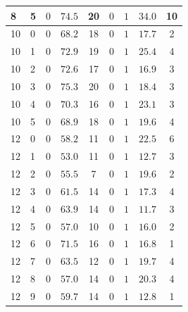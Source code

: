 \documentclass[conference]{IEEEtran}
\begin{document}
\begin{table}[t]
\begin{tabular}{@{}llccc@{\hspace{7pt}}cccc@{}}
8  & 5 & $0$ & $74.5$ & 20 & $0$ & $1$ & $34.0$ & 10 \\
\midrule
10 & 0 & $0$ & $68.2$ & 18 & $0$ & $1$ & $17.7$ & 2 \\
10 & 1 & $0$ & $72.9$ & 19 & $0$ & $1$ & $25.4$ & 4 \\
10 & 2 & $0$ & $72.6$ & 17 & $0$ & $1$ & $16.9$ & 3 \\
10 & 3 & $0$ & $75.3$ & 20 & $0$ & $1$ & $18.4$ & 3 \\
10 & 4 & $0$ & $70.3$ & 16 & $0$ & $1$ & $23.1$ & 3 \\
10 & 5 & $0$ & $68.9$ & 18 & $0$ & $1$ & $19.6$ & 4 \\
\midrule
12 & 0 & $0$ & $58.2$ & 11 & $0$ & $1$ & $22.5$ & 6 \\
12 & 1 & $0$ & $53.0$ & 11 & $0$ & $1$ & $12.7$ & 3 \\
12 & 2 & $0$ & $55.5$ & 7 & $0$ & $1$ & $19.6$ & 2 \\
12 & 3 & $0$ & $61.5$ & 14 & $0$ & $1$ & $17.3$ & 4 \\
12 & 4 & $0$ & $63.9$ & 14 & $0$ & $1$ & $11.7$ & 3 \\
12 & 5 & $0$ & $57.0$ & 10 & $0$ & $1$ & $16.0$ & 2 \\
12 & 6 & $0$ & $71.5$ & 16 & $0$ & $1$ & $16.8$ & 1 \\
12 & 7 & $0$ & $63.5$ & 12 & $0$ & $1$ & $19.7$ & 4 \\
12 & 8 & $0$ & $57.0$ & 14 & $0$ & $1$ & $20.3$ & 4 \\
12 & 9 & $0$ & $59.7$ & 14 & $0$ & $1$ & $12.8$ & 1 \\
\bottomrule
\end{tabular}
\end{table}
\end{document}
